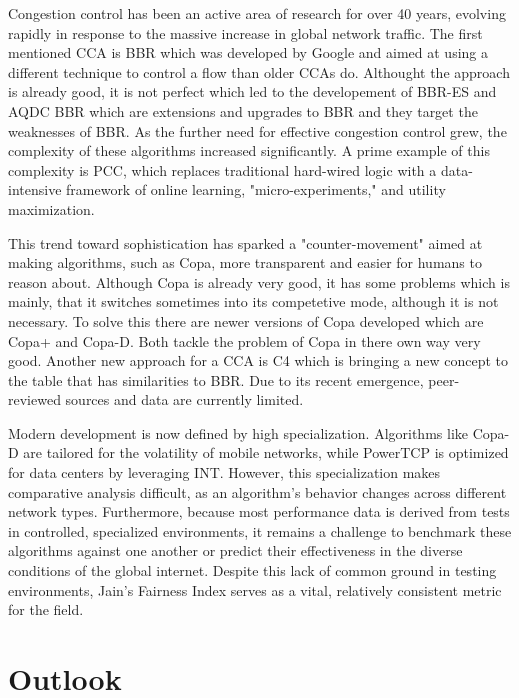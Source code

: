 \documentclass[conference]{IEEEtran}
\begin{document}
Congestion control has been an active area of research for over 40 years, evolving rapidly in response to the massive increase in global network traffic. 
The first mentioned \ac{CCA} is BBR which was developed by Google and aimed at using a different technique to control a flow than older \ac{CCA}s do.
Althought the approach is already good, it is not perfect which led to the developement of BBR-ES and AQDC BBR which are extensions and upgrades to BBR and they target the weaknesses of BBR.
As the further need for effective congestion control grew, the complexity of these algorithms increased significantly. 
A prime example of this complexity is PCC, which replaces traditional hard-wired logic with a data-intensive framework of online learning, "micro-experiments," and utility maximization.  

This trend toward sophistication has sparked a "counter-movement" aimed at making algorithms, such as Copa, more transparent and easier for humans to reason about. 
Although Copa is already very good, it has some problems which is mainly, that it switches sometimes into its competetive mode, although it is not necessary.
To solve this there are newer versions of Copa developed which are Copa+ and Copa-D.
Both tackle the problem of Copa in there own way very good.
Another new approach for a \ac{CCA} is C4 which is bringing a new concept to the table that has similarities to BBR.
Due to its recent emergence, peer-reviewed sources and data are currently limited.

Modern development is now defined by high specialization. 
Algorithms like Copa-D are tailored for the volatility of mobile networks, while PowerTCP is optimized for data centers by leveraging INT.  
However, this specialization makes comparative analysis difficult, as an algorithm's behavior changes across different network types. 
Furthermore, because most performance data is derived from tests in controlled, specialized environments, it remains a challenge to benchmark these algorithms against one another or predict their effectiveness in the diverse conditions of the global internet.
Despite this lack of common ground in testing environments, Jain's Fairness Index serves as a vital, relatively consistent metric for the field. 
 
\section{Outlook}\label{sec:Outlook}
\end{document}
